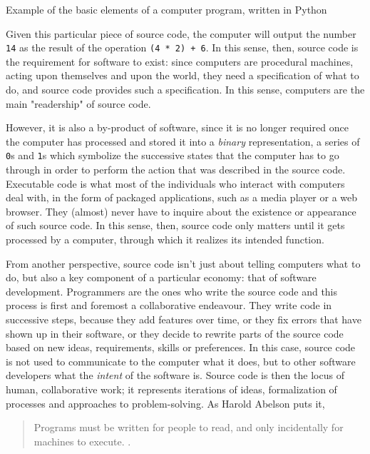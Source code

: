 \begin{listing}
    \inputminted{python}{./corpus/simple.py}
    \caption{Example of the basic elements of a computer program, written in Python}
    \label{code:simple_example}
\end{listing}

Given this particular piece of source code, the computer will output the number \lstinline{14} as the result of the operation \lstinline{(4 * 2) + 6}. In this sense, then, source code is the requirement for software to exist: since computers are procedural machines, acting upon themselves and upon the world, they need a specification of what to do, and source code provides such a specification. In this sense, computers are the main "readership" of source code.

However, it is  also a by-product of software, since it is no longer required once the computer has processed and stored it into a \emph{binary} representation, a series of \lstinline{0}s and \lstinline{1}s which symbolize the successive states that the computer has to go through in order to perform the action that was described in the source code. Executable code is what most of the individuals who interact with computers deal with, in the form of packaged applications, such as a media player or a web browser. They (almost) never have to inquire about the existence or appearance of such source code. In this sense, then, source code only matters until it gets processed by a computer, through which it realizes its intended function.

From another perspective, source code isn't just about telling computers what to do, but also a key component of a particular economy: that of software development. Programmers are the ones who write the source code and this process is first and foremost a collaborative endeavour. They write code in successive steps, because they add features over time, or they fix errors that have shown up in their software, or they decide to rewrite parts of the source code based on new ideas, requirements, skills or preferences. In this case, source code is not used to communicate to the computer what it does, but to other software developers what the \emph{intent} of the software is. Source code is then the locus of human, collaborative work; it represents iterations of ideas, formalization of processes and approaches to problem-solving. As Harold Abelson puts it,

\begin{quote}
    Programs must be written for people to read, and only incidentally for machines to execute. \citep{abelson_structure_1979}.
\end{quote}

